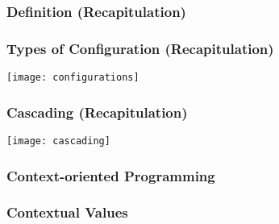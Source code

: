 \begin{frame}
	\frametitle{Definition (Recapitulation)}
\end{frame}

\begin{frame}
	\frametitle{Types of Configuration (Recapitulation)}
	\begin{description}
	\end{description}
\end{frame}

\begin{frame}
	\hspace*{-1em}\texttt{[image: configurations]}
\end{frame}

\begin{frame}
	\frametitle{Cascading (Recapitulation)}
	\texttt{[image: cascading]}
\end{frame}

\begin{frame}
	\frametitle{Context-oriented Programming}
\end{frame}

\begin{frame}
	\frametitle{Contextual Values}
\end{frame}

